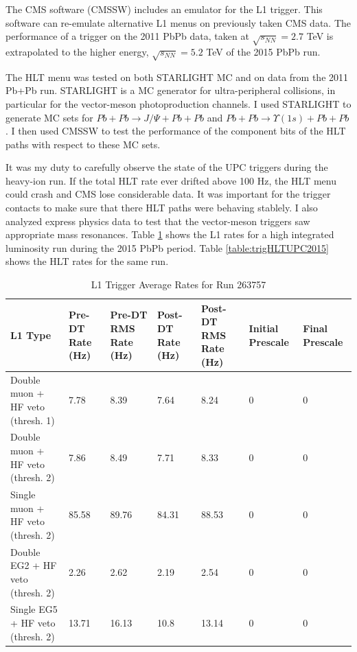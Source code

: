 The CMS software (CMSSW) includes an emulator for the L1 trigger. This software can re-emulate alternative L1 menus on previously taken CMS data. The performance of a trigger on the 2011 PbPb data, taken at $\sqrt{s_{NN}} = 2.7$ TeV is extrapolated to the higher energy, $\sqrt{s_{NN}} = 5.2$ TeV of the 2015 PbPb run.

The HLT menu was tested on both STARLIGHT MC and on data from the 2011 Pb+Pb run. STARLIGHT is a MC generator for ultra-peripheral collisions, in particular for the vector-meson photoproduction channels. I used STARLIGHT to generate MC sets for $Pb+Pb\rightarrow J/\Psi+Pb+Pb$ and $Pb+Pb\rightarrow \Upsilon(1s)+Pb+Pb$. I then used CMSSW to test the performance of the component bits of the HLT paths with respect to these MC sets. 

It was my duty to carefully observe the state of the UPC triggers during the heavy-ion run. If the total HLT rate ever drifted above 100 Hz, the HLT menu could crash and CMS lose considerable data. It was important for the trigger contacts to make sure that there HLT paths were behaving stablely. I also analyzed express physics data to test that the vector-meson triggers saw appropriate mass resonances. Table \ref{table:trigL1UPC2015} shows the L1 rates for a high integrated luminosity run during the 2015 PbPb period. Table \ref{table:trigHLTUPC2015} shows the HLT rates for the same run. 

\begin{table}[h!]
\centering
\caption{L1 Trigger Average Rates for Run 263757}
\label{table:trigL1UPC2015}
\begin{tabular}{@{}l|p{1.6cm}|p{1.6cm}|p{1.6cm}|p{1.6cm}|p{1.3cm}|p{1.3cm}|}
\toprule
L1 Type                           & Pre-DT Rate (Hz) & Pre-DT RMS Rate (Hz) & Post-DT Rate (Hz) & Post-DT RMS Rate (Hz) & Initial Prescale & Final Prescale \\ \midrule
Double muon + HF veto (thresh. 1) & 7.78             & 8.39                 & 7.64              & 8.24                  & 0                & 0              \\
Double muon + HF veto (thresh. 2) & 7.86             & 8.49                 & 7.71              & 8.33                  & 0                & 0              \\
Single muon + HF veto (thresh. 2) & 85.58            & 89.76                & 84.31             & 88.53                 & 0                & 0              \\
Double EG2 + HF veto (thresh. 2)  & 2.26             & 2.62                 & 2.19              & 2.54                  & 0                & 0              \\
Single EG5 + HF veto (thresh. 2)  & 13.71            & 16.13                & 10.8              & 13.14                 & 0                & 0              \\ \bottomrule
\end{tabular}
\end{table}

